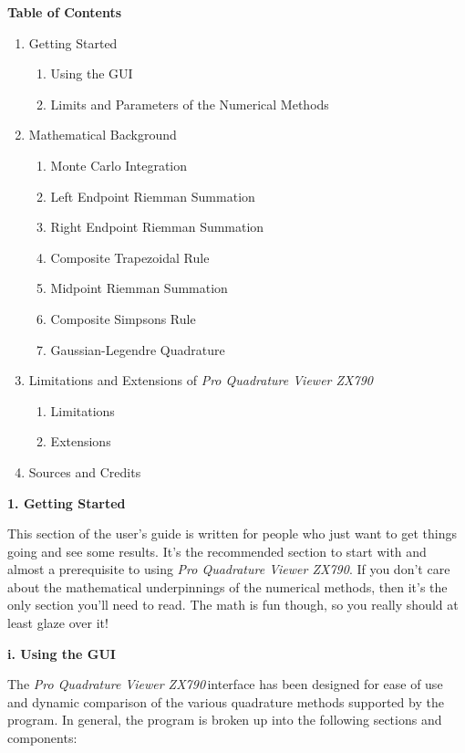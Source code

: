 \documentclass[12pt]{article}
\newcommand{\newLine}{\vspace{5mm}}
\newcommand{\appname}{\textit{Pro Quadrature Viewer ZX790}}
\newcommand{\nextsection}[1]{\newpage\noindent\Large\textbf{#1}\vspace{10mm}\normalsize}
\newcommand{\nextsubsection}[1]{\newLine \noindent \large \textbf{#1} \normalsize}
\begin{document}
 
\nextsection{Table of Contents}
\begin{enumerate}[\indent 1.]
\item Getting Started 
	\begin{enumerate}[\indent i.]
	\item Using the GUI
	\item Limits and Parameters of the Numerical Methods
	\end{enumerate}
\item Mathematical Background
	\begin{enumerate}[\indent i.]
	\item Monte Carlo Integration
	\item Left Endpoint Riemman Summation
	\item Right Endpoint Riemman Summation
	\item Composite Trapezoidal Rule
	\item Midpoint Riemman Summation
	\item Composite Simpsons Rule
	\item Gaussian-Legendre Quadrature
	\end{enumerate}
\item Limitations and Extensions of \appname
	\begin{enumerate}[\indent i.]
	\item Limitations
	\item Extensions
	\end{enumerate}
\item Sources and Credits
\end{enumerate}



\nextsection{1. Getting Started}

\newLine This section of the user's guide is written for people who just want to get things going and see some results. It's the recommended section to start with and almost a prerequisite to using \appname. If you don't care about the mathematical underpinnings of the numerical methods, then it's the only section you'll need to read. The math is fun though, so you really should at least glaze over it!

\nextsubsection{i. Using the GUI} 

\newLine The \appname \,interface has been designed for ease of use and dynamic comparison of the various quadrature methods supported by the program. In general, the program is broken up into the following sections and components:
\end{document}
